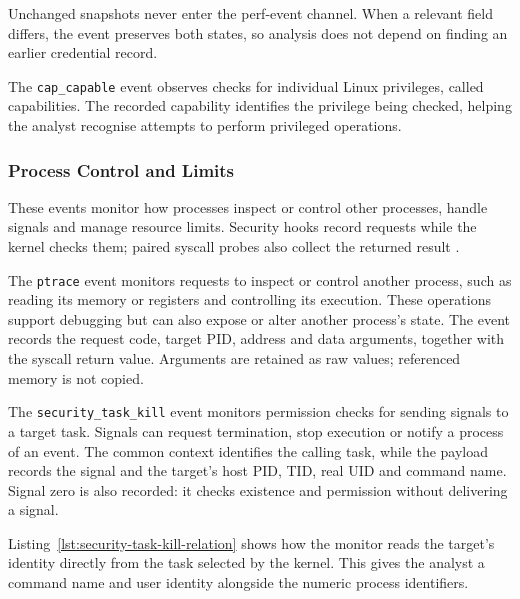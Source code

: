 Unchanged snapshots never enter the perf-event channel. When a relevant field
differs, the event preserves both states, so analysis does not depend on finding
an earlier credential record.

The \texttt{cap\_capable} event observes checks for individual Linux
privileges, called capabilities. The recorded capability identifies
the privilege being checked, helping the analyst recognise attempts
to perform privileged operations.

\subsubsection{Process Control and Limits}
\label{subsubsec:implementation-process-control-limits}

These events monitor how processes inspect or control other processes,
handle signals and manage resource limits. Security hooks record requests
while the kernel checks them; paired syscall probes also collect the
returned result \cite{linux_lsm_development}.

The \texttt{ptrace} event monitors requests to inspect or control another
process, such as reading its memory or registers and controlling its
execution. These operations support debugging but can also expose or alter
another process's state. The event records the request code, target PID,
address and data arguments, together with the syscall return value.
Arguments are retained as raw values; referenced memory is not copied.

The \texttt{security\_task\_kill} event monitors permission checks for
sending signals to a target task. Signals can request termination, stop
execution or notify a process of an event. The common context identifies
the calling task, while the payload records the signal and the target's
host PID, TID, real UID and command name. Signal zero is also recorded:
it checks existence and permission without delivering a signal.

Listing~\ref{lst:security-task-kill-relation} shows how the monitor reads
the target's identity directly from the task selected by the kernel.
This gives the analyst a command name and user identity alongside the
numeric process identifiers.

